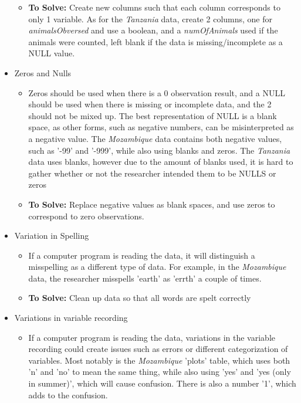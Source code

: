 \documentclass{article}
\begin{document}
\begin{itemize}
\begin{itemize}
        \item \textbf{To Solve:} Create new columns such that each column corresponds to only 1 variable. As for the \textit{Tanzania} data, create 2 columns, one for \textit{animalsObversed} and use a boolean, and a \textit{numOfAnimals} used if the animals were counted, left blank if the data is missing/incomplete as a NULL value.
    \end{itemize}
    \item Zeros and Nulls
    \begin{itemize}
        \item Zeros should be used when there is a 0 observation result, and a NULL should be used when there is missing or incomplete data, and the 2 should not be mixed up. The best representation of NULL is a blank space, as other forms, such as negative numbers, can be misinterpreted as a negative value. The \textit{Mozambique} data contains both negative values, such as '-99' and '-999', while also using blanks and zeros. The \textit{Tanzania} data uses blanks, however due to the amount of blanks used, it is hard to gather whether or not the researcher intended them to be NULLS or zeros
        \item \textbf{To Solve:} Replace negative values as blank spaces, and use zeros to correspond to zero observations. 
    \end{itemize}
    \item Variation in Spelling
    \begin{itemize}
        \item If a computer program is reading the data, it will distinguish a misspelling as a different type of data. For example, in the \textit{Mozambique} data, the researcher misspells 'earth' as 'errth' a couple of times.
        \item \textbf{To Solve:} Clean up data so that all words are spelt correctly
    \end{itemize}
    \item Variations in variable recording
    \begin{itemize}
        \item If a computer program is reading the data, variations in the variable recording could create issues such as errors or different categorization of variables. Most notably is the \textit{Mozambique} 'plots' table, which uses both 'n' and 'no' to mean the same thing, while also using 'yes' and 'yes (only in summer)', which will cause confusion. There is also a number '1', which adds to the confusion.

\end{itemize}
\end{itemize}
\end{document}
